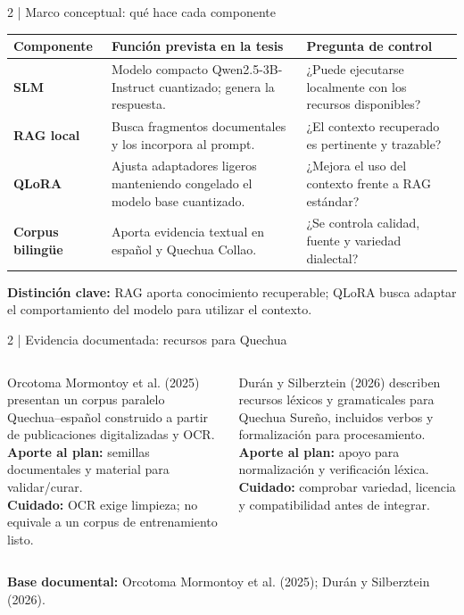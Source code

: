 \documentclass[aspectratio=169,10pt,spanish]{beamer}
\newcommand{\fuente}[1]{\vfill{\tiny\color{bpNavy!75}\textbf{Base documental:} #1}}
\begin{document}
\begin{frame}{2 | Marco conceptual: qué hace cada componente}
\small
\begin{tabularx}{\textwidth}{>{\bfseries}p{2.45cm} X p{3.5cm}}
\toprule
Componente & Función prevista en la tesis & Pregunta de control\\
\midrule
SLM & Modelo compacto Qwen2.5-3B-Instruct cuantizado; genera la respuesta. & ¿Puede ejecutarse localmente con los recursos disponibles?\\
RAG local & Busca fragmentos documentales y los incorpora al prompt. & ¿El contexto recuperado es pertinente y trazable?\\
QLoRA & Ajusta adaptadores ligeros manteniendo congelado el modelo base cuantizado. & ¿Mejora el uso del contexto frente a RAG estándar?\\
Corpus bilingüe & Aporta evidencia textual en español y Quechua Collao. & ¿Se controla calidad, fuente y variedad dialectal?\\
\bottomrule
\end{tabularx}
\vspace{0.28cm}
\begin{tcolorbox}[colback=bpLightGray,colframe=bpGold]
\centering\small\textbf{Distinción clave:} RAG aporta conocimiento recuperable; QLoRA busca adaptar el comportamiento del modelo para utilizar el contexto.
\end{tcolorbox}
\end{frame}

\begin{frame}{2 | Evidencia documentada: recursos para Quechua}
\begin{columns}[T,onlytextwidth]
\begin{tcolorbox}[colback=bpLightGray,colframe=bpBlue,title={Corpus paralelo}]
\small Orcotoma Mormontoy et al. (2025) presentan un corpus paralelo Quechua--español construido a partir de publicaciones digitalizadas y OCR.\\[2mm]
\textbf{Aporte al plan:} semillas documentales y material para validar/curar.\\
\textbf{Cuidado:} OCR exige limpieza; no equivale a un corpus de entrenamiento listo.
\end{tcolorbox}
\begin{tcolorbox}[colback=bpLightGray,colframe=bpGold,title={Recursos léxicos}]
\small Durán y Silberztein (2026) describen recursos léxicos y gramaticales para Quechua Sureño, incluidos verbos y formalización para procesamiento.\\[2mm]
\textbf{Aporte al plan:} apoyo para normalización y verificación léxica.\\
\textbf{Cuidado:} comprobar variedad, licencia y compatibilidad antes de integrar.
\end{tcolorbox}
\end{columns}
\fuente{Orcotoma Mormontoy et al. (2025); Durán y Silberztein (2026).}
\end{frame}
\end{document}

